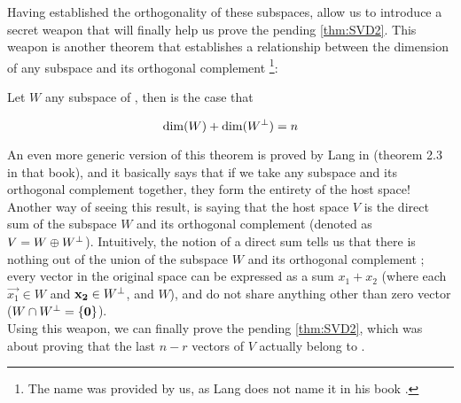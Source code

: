 Having established the orthogonality of these subspaces, allow us to
introduce a secret weapon that will finally help us prove the pending
\cref{thm:SVD2}. This weapon is another theorem that establishes a
relationship between the dimension of any subspace and its orthogonal
complement \footnote{The
  name was provided by us, as Lang does not name it in his book
  \cite{lang04}.}: \\

\begin{theorem}
\label{thm:ortdim}
Let $W$ any subspace of , then is the case that

\[
\operatorname{dim}(W) + \operatorname{dim}({W}^{\bot}) = n
\]
\end{theorem}
\hfill

An even more generic version of this theorem is proved by Lang in
\cite{lang04} (theorem 2.3 in that book), and it basically says that
if we take any subspace and its orthogonal complement together, they
form the entirety of the host space! Another way of seeing this
result, is saying that the host space $V$ is the direct sum of the
subspace $W$ and its orthogonal  complement (denoted as $V = W \oplus
{W}^{\bot}$). Intuitively, the notion 
of a direct sum tells us that there is nothing out of the union of the
subspace $W$ and its orthogonal complement ; every vector in
the original space can be expressed as a sum $x_1 + x_2$ (where
each $\vec{x_1} \in W$ and $\mathbf{x_2} \in {W}^{\bot}$, and $W$), and
 do not share anything other than zero vector ($W \cap
{W}^{\bot} = \{\mathbf{0}\}$). \\

Using this weapon, we can finally prove the pending 
\cref{thm:SVD2}, which was about proving that the last $n-r$ vectors
of $V$ actually belong to . \\

\svdtwo*

